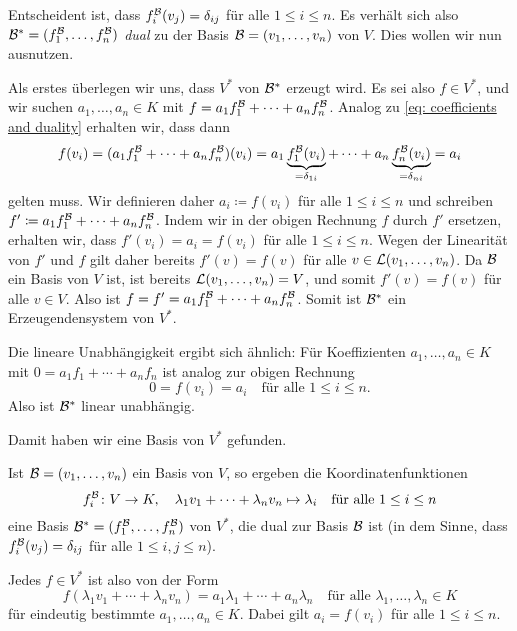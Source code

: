 \documentclass[a4paper,10pt]{article}
\begin{document}
Entscheident ist, dass $f^{\mathcal{B}}_i(v_j) = \delta_{ij}$ für alle $1 \leq i \leq n$. Es verhält sich also $\mathcal{B}^* = (f^{\mathcal{B}}_1, \dotsc, f^{\mathcal{B}}_n)$ \emph{dual} zu der Basis $\mathcal{B} = (v_1, \dotsc, v_n)$ von $V$. Dies wollen wir nun ausnutzen.

Als erstes überlegen wir uns, dass $V^*$ von $\mathcal{B}^*$ erzeugt wird. Es sei also $f \in V^*$, und wir suchen $a_1, \dotsc, a_n \in K$ mit $f = a_1 f^{\mathcal{B}}_1 + \dotsb + a_n f^{\mathcal{B}}_n$. Analog zu \eqref{eq: coefficients and duality} erhalten wir, dass dann
\[
 f(v_i)
 = (a_1 f^{\mathcal{B}}_1 + \dotsb + a_n f^{\mathcal{B}}_n)(v_i)
 = a_1 \underbrace{f^{\mathcal{B}}_1(v_i)}_{=\delta_{1i}} + \dotsb + a_n \underbrace{f^{\mathcal{B}}_n(v_i)}_{=\delta_{ni}}
 = a_i
\]
gelten muss. Wir definieren daher $a_i \coloneqq f(v_i)$ für alle $1 \leq i \leq n$ und schreiben $f' \coloneqq a_1 f^{\mathcal{B}}_1 + \dotsb + a_n f^{\mathcal{B}}_n$. Indem wir in der obigen Rechnung $f$ durch $f'$ ersetzen, erhalten wir, dass $f'(v_i) = a_i = f(v_i)$ für alle $1 \leq i \leq n$. Wegen der Linearität von $f'$ und $f$ gilt daher bereits $f'(v) = f(v)$ für alle $v \in \mathcal{L}(v_1, \dotsc, v_n)$. Da $\mathcal{B}$ ein Basis von $V$ ist, ist bereits $\mathcal{L}(v_1, \dotsc, v_n) = V$, und somit $f'(v) = f(v)$ für alle $v \in V$. Also ist $f = f' = a_1 f^{\mathcal{B}}_1 + \dotsb + a_n f^{\mathcal{B}}_n$. Somit ist $\mathcal{B}^*$ ein Erzeugendensystem von $V^*$.

Die lineare Unabhängigkeit ergibt sich ähnlich: Für Koeffizienten $a_1, \dotsc, a_n \in K$ mit $0 = a_1 f_1 + \dotsb + a_n f_n$ ist analog zur obigen Rechnung
\[
 0 = f(v_i) = a_i
 \quad
 \text{für alle $1 \leq i \leq n$}.
\]
Also ist $\mathcal{B}^*$ linear unabhängig.

Damit haben wir eine Basis von $V^*$ gefunden.

\begin{shaded}
 Ist $\mathcal{B} = (v_1, \dotsc, v_n)$ ein Basis von $V$, so ergeben die Koordinatenfunktionen
 \[
  f^{\mathcal{B}}_i \colon V \to K, \quad \lambda_1 v_1 + \dotsb + \lambda_n v_n \mapsto \lambda_i
  \quad
  \text{für alle $1 \leq i \leq n$}
 \]
 eine Basis $\mathcal{B}^* = (f^{\mathcal{B}}_1, \dotsc, f^{\mathcal{B}}_n)$ von $V^*$, die dual zur Basis $\mathcal{B}$ ist (in dem Sinne, dass $f^{\mathcal{B}}_i(v_j) = \delta_{ij}$ für alle $1 \leq i,j \leq n$).
 
 Jedes $f \in V^*$ ist also von der Form
 \[
  f(\lambda_1 v_1 + \dotsb + \lambda_n v_n)
  = a_1 \lambda_1 + \dotsb + a_n \lambda_n
  \quad
  \text{für alle $\lambda_1, \dotsc, \lambda_n \in K$}
 \]
 für eindeutig bestimmte $a_1, \dotsc, a_n \in K$. Dabei gilt $a_i = f(v_i)$ für alle $1 \leq i \leq n$.
\end{shaded}
\end{document}
